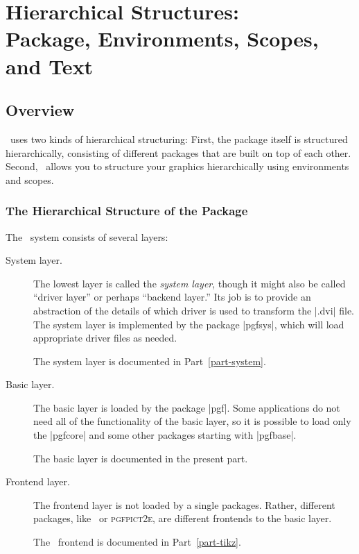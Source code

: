 %


\section[Hierarchical Structures: Package, Environments, Scopes, and Text]
{Hierarchical Structures:\\
  Package, Environments, Scopes, and Text}


\subsection{Overview}

\pgfname\ uses two kinds of hierarchical structuring: First, the
package itself is structured hierarchically, consisting of different
packages that are built on top of each other. Second, \pgfname\ allows you
to structure your graphics hierarchically using environments and scopes.

\subsubsection{The  Hierarchical Structure of the Package}

The \pgfname\ system consists of several layers:

\begin{description}
\item[System layer.]
  The lowest layer is called the \emph{system layer}, though it might
  also be called ``driver layer'' or perhaps ``backend layer.'' Its
  job is to provide an abstraction of the details of which driver
  is used to transform the |.dvi| file. The system layer is
  implemented by the package |pgfsys|, which will load appropriate
  driver files as needed.

  The system layer is documented in Part~\ref{part-system}.
\item[Basic layer.]
  The basic layer is loaded by the package |pgf|. Some
  applications do not need all of the functionality of the basic
  layer, so it is possible to load only the |pgfcore| and some other
  packages starting with |pgfbase|.

  The basic layer is documented in the present part.
\item[Frontend layer.]
  The frontend layer is not loaded by a single packages. Rather,
  different packages, like \tikzname\ or \textsc{pgfpict2e}, are
  different frontends to the basic layer.

  The \tikzname\ frontend is documented in Part~\ref{part-tikz}.
\end{description}

